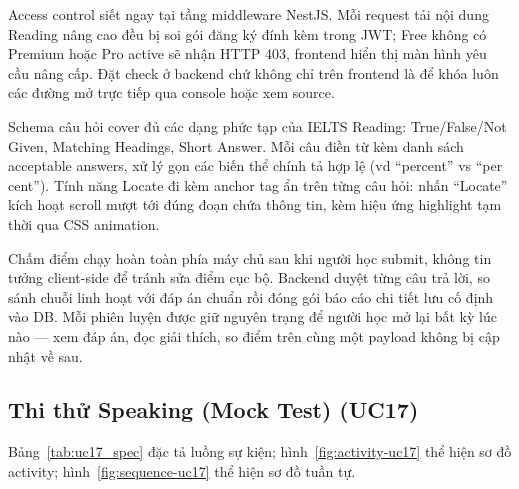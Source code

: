 Access control siết ngay tại tầng middleware NestJS. Mỗi request tải nội dung Reading nâng cao đều bị soi gói đăng ký đính kèm trong JWT; Free không có Premium hoặc Pro active sẽ nhận HTTP 403, frontend hiển thị màn hình yêu cầu nâng cấp. Đặt check ở backend chứ không chỉ trên frontend là để khóa luôn các đường mở trực tiếp qua console hoặc xem source.

\begin{sloppypar}
Schema câu hỏi cover đủ các dạng phức tạp của IELTS Reading: True/False/Not Given, Matching Headings, Short Answer. Mỗi câu điền từ kèm danh sách acceptable answers, xử lý gọn các biến thể chính tả hợp lệ (vd ``percent'' vs ``per cent''). Tính năng Locate đi kèm anchor tag ẩn trên từng câu hỏi: nhấn ``Locate'' kích hoạt scroll mượt tới đúng đoạn chứa thông tin, kèm hiệu ứng highlight tạm thời qua CSS animation.
\end{sloppypar}

\begin{sloppypar}
Chấm điểm chạy hoàn toàn phía máy chủ sau khi người học submit, không tin tưởng client-side để tránh sửa điểm cục bộ. Backend duyệt từng câu trả lời, so sánh chuỗi linh hoạt với đáp án chuẩn rồi đóng gói báo cáo chi tiết lưu cố định vào DB. Mỗi phiên luyện được giữ nguyên trạng để người học mở lại bất kỳ lúc nào --- xem đáp án, đọc giải thích, so điểm trên cùng một payload không bị cập nhật về sau.
\end{sloppypar}

\subsection{Thi thử Speaking (Mock Test) (UC17)}
Bảng~\ref{tab:uc17_spec} đặc tả luồng sự kiện; hình~\ref{fig:activity-uc17} thể hiện sơ đồ activity; hình~\ref{fig:sequence-uc17} thể hiện sơ đồ tuần tự.
